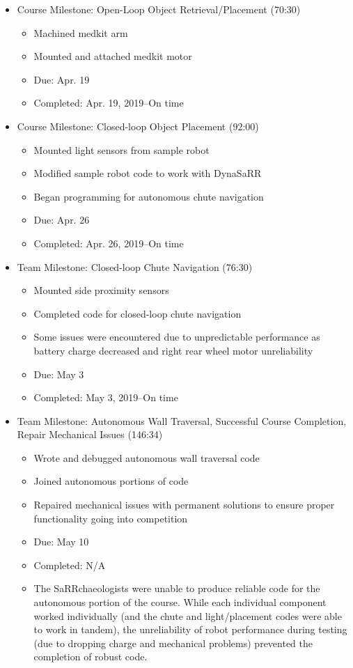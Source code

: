 \begin{itemize}
\item Course Milestone: Open-Loop Object Retrieval/Placement (70:30)
\begin{itemize}
\item Machined medkit arm
\item Mounted and attached medkit motor 
\item Due: Apr. 19
\item Completed: Apr. 19, 2019--On time
\end{itemize}
\end{itemize}
\begin{itemize}
\item Course Milestone: Closed-loop Object Placement (92:00)
\begin{itemize}
\item Mounted light sensors from sample robot
\item Modified sample robot code to work with DynaSaRR
\item Began programming for autonomous chute navigation
\item Due: Apr. 26
\item Completed: Apr. 26, 2019--On time
\end{itemize}
\end{itemize}
\begin{itemize}
\item Team Milestone: Closed-loop Chute Navigation (76:30) 
\begin{itemize}
\item Mounted side proximity sensors
\item Completed code for closed-loop chute navigation
\item Some issues were encountered due to unpredictable performance as battery charge decreased and right rear wheel motor unreliability
\item Due: May 3
\item Completed: May 3, 2019--On time
\end{itemize}
\end{itemize}
\begin{itemize}
\item Team Milestone: Autonomous Wall Traversal, Successful Course Completion, Repair Mechanical Issues (146:34)
\begin{itemize}
\item Wrote and debugged autonomous wall traversal code
\item Joined autonomous portions of code
\item Repaired mechanical issues with permanent solutions to ensure proper functionality going into competition
\item Due: May 10
\item Completed: N/A
\item The SaRRchaeologists were unable to produce reliable code for the autonomous portion of the course. While each individual component worked individually (and the chute and light/placement codes were able to work in tandem), the unreliability of robot performance during testing (due to dropping charge and mechanical problems) prevented the completion of robust code.
\end{itemize}
\end{itemize}
